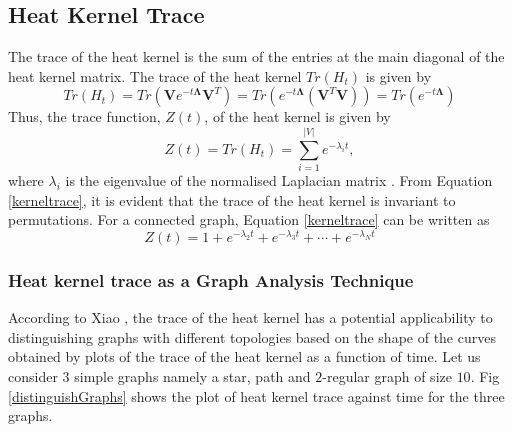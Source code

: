 \documentclass[10pt,a4paper]{article}
\begin{document}
        \subsection{Heat Kernel Trace}
        
        The trace of the heat kernel is the sum of the entries at the main diagonal of the heat kernel matrix. 
        The trace of the heat kernel $Tr(H_t)$ is given by
        \begin{equation}
        Tr(H_t) = Tr(\mathbf{V} e^{-t \mathbf{\Lambda}} \mathbf{V}^T)=Tr( e^{-t\mathbf{\Lambda}} (\mathbf{V}^T \mathbf{V})) = Tr(e^{- t\mathbf{\Lambda}})
        \end{equation}
        Thus, the trace function, $Z(t)$, of the heat kernel is given by 
        \begin{equation}
        Z(t) = Tr(H_t) = \sum_{i=1}^{|V|} e^{-\lambda_i t},
        \label{kerneltrace}
        \end{equation}
        where $\lambda_i$ is the eigenvalue of the normalised Laplacian matrix \cite{xiao2009graph}. 
        From Equation \ref{kerneltrace}, it is evident that the trace of the heat kernel is invariant to permutations.
        For a connected graph, Equation \ref{kerneltrace} can be written as 
        \begin{equation}
        Z(t) =  1+ e^{-\lambda_2 t} + e^{-\lambda_3t} + \cdots + e^{-\lambda_N t}
        \label{alttraceformula}
        \end{equation}
        
        \subsubsection{Heat kernel trace as a Graph Analysis Technique}
        According to Xiao \cite{xiao2009graph}, the trace of the heat kernel has a potential applicability to distinguishing graphs with different topologies based on the shape of the curves obtained by plots of the trace of the heat kernel as a function of time. Let us consider $3$ simple graphs namely a star, path and $2$-regular graph of size $10$. Fig \ref{distinguishGraphs} shows the plot of heat kernel trace against time for the three graphs.
        
\end{document}

